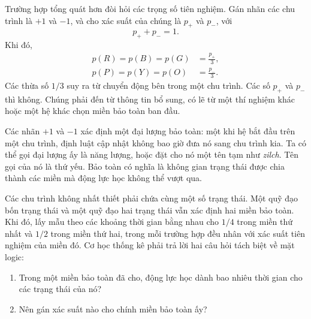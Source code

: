 Trường hợp tổng quát hơn đòi hỏi các trọng số tiên nghiệm. Gán nhãn các chu trình là \(+1\) và \(-1\), và cho xác suất của chúng là \(p_+\) và \(p_-\), với
\begin{equation}
 p_++p_-=1.
\end{equation}
Khi đó,
\begin{align}
 p(R)=p(B)=p(G)&=\frac{p_+}{3},\\
 p(P)=p(Y)=p(O)&=\frac{p_-}{3}.
 \label{eq:sm1-sector-weights}
\end{align}
Các thừa số \(1/3\) suy ra từ chuyển động bên trong một chu trình. Các số \(p_+\) và \(p_-\) thì không. Chúng phải đến từ thông tin bổ sung, có lẽ từ một thí nghiệm khác hoặc một hệ khác chọn miền bảo toàn ban đầu.

Các nhãn \(+1\) và \(-1\) xác định một đại lượng bảo toàn: một khi hệ bắt đầu trên một chu trình, định luật cập nhật không bao giờ đưa nó sang chu trình kia. Ta có thể gọi đại lượng ấy là năng lượng, hoặc đặt cho nó một tên tạm như \emph{zilch}. Tên gọi của nó là thứ yếu. Bảo toàn có nghĩa là không gian trạng thái được chia thành các miền mà động lực học không thể vượt qua.

Các chu trình không nhất thiết phải chứa cùng một số trạng thái. Một quỹ đạo bốn trạng thái và một quỹ đạo hai trạng thái vẫn xác định hai miền bảo toàn. Khi đó, lấy mẫu theo các khoảng thời gian bằng nhau cho \(1/4\) trong miền thứ nhất và \(1/2\) trong miền thứ hai, trong mỗi trường hợp đều nhân với xác suất tiên nghiệm của miền đó. Cơ học thống kê phải trả lời hai câu hỏi tách biệt về mặt logic:
\begin{enumerate}
\item Trong một miền bảo toàn đã cho, động lực học dành bao nhiêu thời gian cho các trạng thái của nó?
\item Nên gán xác suất nào cho chính miền bảo toàn ấy?
\end{enumerate}

\begin{classroomqa}
\end{classroomqa}

